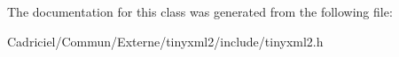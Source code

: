 The documentation for this class was generated from the following file\+:\begin{DoxyCompactItemize}
\item 
Cadriciel/\+Commun/\+Externe/tinyxml2/include/tinyxml2.\+h\end{DoxyCompactItemize}
